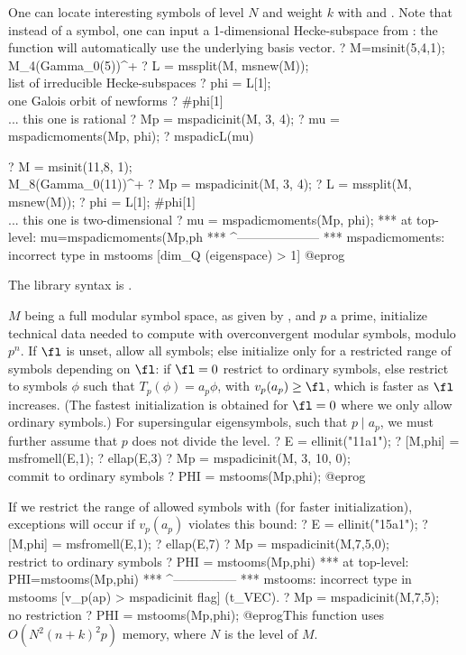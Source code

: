One can locate interesting symbols of level $N$ and weight $k$ with
 and . Note that instead of a symbol, one can
input a 1-dimensional Hecke-subspace from : the function will
automatically use the underlying basis vector.
\bprog
? M=msinit(5,4,1); \\ M_4(Gamma_0(5))^+
? L = mssplit(M, msnew(M)); \\ list of irreducible Hecke-subspaces
? phi = L[1]; \\ one Galois orbit of newforms
? #phi[1] \\... this one is rational
? Mp = mspadicinit(M, 3, 4);
? mu = mspadicmoments(Mp, phi);
? mspadicL(mu)

? M = msinit(11,8, 1); \\ M_8(Gamma_0(11))^+
? Mp = mspadicinit(M, 3, 4);
? L = mssplit(M, msnew(M));
? phi = L[1]; #phi[1] \\ ... this one is two-dimensional
? mu = mspadicmoments(Mp, phi);
 ***   at top-level: mu=mspadicmoments(Mp,ph
 ***                    ^--------------------
 *** mspadicmoments: incorrect type in mstooms [dim_Q (eigenspace) > 1]
@eprog

The library syntax is .

\label{se:mspadicinit}
$M$ being a full modular symbol space, as given by , and $p$
a prime, initialize technical data needed to compute with overconvergent
modular symbols, modulo $p^n$. If $\fl$ is unset, allow
all symbols; else initialize only for a restricted range of symbols
depending on $\fl$: if $\fl = 0$ restrict to ordinary symbols, else
restrict to symbols $\phi$ such that $T_p(\phi) = a_p \phi$,
with $v_p(a_p) \geq \fl$, which is faster as $\fl$ increases.
(The fastest initialization is obtained for $\fl = 0$ where we only allow
ordinary symbols.) For supersingular eigensymbols, such that $p\mid a_p$, we
must further assume that $p$ does not divide the level.
\bprog
? E = ellinit("11a1");
? [M,phi] = msfromell(E,1);
? ellap(E,3)
? Mp = mspadicinit(M, 3, 10, 0); \\ commit to ordinary symbols
? PHI = mstooms(Mp,phi);
@eprog

If we restrict the range of allowed symbols with \fl (for faster
initialization), exceptions will occur if $v_p(a_p)$ violates this bound:
\bprog
? E = ellinit("15a1");
? [M,phi] = msfromell(E,1);
? ellap(E,7)
? Mp = mspadicinit(M,7,5,0); \\ restrict to ordinary symbols
? PHI = mstooms(Mp,phi)
***   at top-level: PHI=mstooms(Mp,phi)
***                     ^---------------
*** mstooms: incorrect type in mstooms [v_p(ap) > mspadicinit flag] (t_VEC).
? Mp = mspadicinit(M,7,5); \\ no restriction
? PHI = mstooms(Mp,phi);
@eprog\noindent This function uses $O(N^2(n+k)^2p)$ memory, where $N$ is the
level of $M$.

